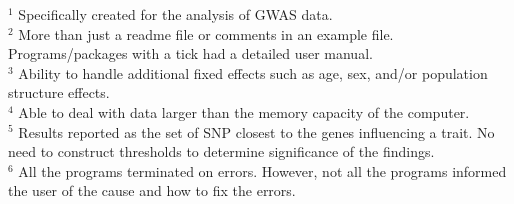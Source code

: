 \documentclass{article}
\begin{document}
\begin{landscape}
\begin{table}
\begin{tabular}{lccccccccc}
\end{tabular}
{$^1$ \scriptsize{Specifically created for the analysis of GWAS data.}}\\
{$^2$ \scriptsize{More than just a readme file or comments in an example file. Programs/packages with a tick had a detailed user manual.}}\\
{$^3$ \scriptsize{Ability to handle additional fixed effects such as  age, sex, and/or population structure effects.}} \\
{$^4$ \scriptsize{Able to deal with data larger than the memory capacity of the computer.}} \\
{$^5$ \scriptsize{Results reported as the set of SNP closest to the genes influencing a trait. No need to construct thresholds to determine 
significance of the findings.}}\\
{$^6$  \scriptsize{All the programs terminated on errors. However, not all the programs informed the user of the cause and how to fix the errors.}}\\
\end{table}


\end{landscape}
\end{document}
